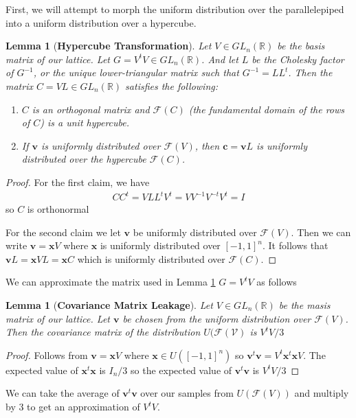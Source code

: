 \documentclass[12pt]{amsart}
\newtheorem{lemma}[theorem]{Lemma}
\theoremstyle{definition}
\theoremstyle{remark}
\newcommand{\R}{\mathbb{R}}
\begin{document}
First, we will attempt to morph the uniform distribution over the parallelepiped into a uniform distribution over a hypercube.

\begin{lemma}[\textbf{Hypercube Transformation}]\label{lem:hypercubeTransformation}
Let $V\in GL_n(\R)$ be the basis matrix of our lattice. Let $G = V^tV \in GL_n(\R)$. And let $L$ be the Cholesky factor of $G^{-1}$, or the unique lower-triangular matrix such that $G^{-1}=LL^t$. Then the matrix $C=VL\in GL_n(\R)$ satisfies the following: 
\begin{enumerate}
    \item $C$ is an orthogonal matrix and $\mathcal{F}(C)$ (the fundamental domain of the rows of $C$) is a unit hypercube.
    \item If $\bm{v}$ is uniformly distributed over $\mathcal{F}(V)$, then $\bm{c} = \bm{v}L$ is uniformly distributed over the hypercube $\mathcal{F}(C)$.
\end{enumerate}
\end{lemma}
\begin{proof}
    For the first claim, we have 
    \begin{align*}
        CC^t = VLL^tV^t=VV^{-1}V^{-t}V^t = I
    \end{align*}
    so $C$ is orthonormal
    
    For the second claim we let $\bm{v}$ be uniformly distributed over $\mathcal{F}(V)$. Then we can write $\bm{v}=\bm{x}V$ where $\bm{x}$ is uniformly distributed over $[-1,1]^n$. It follows that $\bm{v}L =\bm{x}VL=\bm{x}C$ which is uniformly distributed over $\mathcal{F}(C)$.
\end{proof}

We can approximate the matrix used in Lemma \ref{lem:hypercubeTransformation} $G = V^tV$ as follows
\begin{lemma}[\textbf{Covariance Matrix Leakage}]\label{lem:covarianceLeak}
Let $V\in GL_n(\R)$ be the masis matrix of our lattice. Let $\bm{v}$ be chosen from the uniform distribution over $\mathcal{F}(V)$. Then the covariance matrix of the distribution $U(\mathcal{F(V)}$ is $V^tV/3$
\end{lemma}
\begin{proof}
Follows from $\bm{v}=\bm{x}V$ where $\bm{x}\in U([-1,1]^n)$ so $\bm{v}^t\bm{v} = V^t\bm{x}^t\bm{x}V$. The expected value of $\bm{x}^t\bm{x}$ is $I_n/3$ so the expected value of $\bm{v}^t\bm{v}$ is $V^tV/3$
\end{proof}

We can take the average of $\bm{v}^t\bm{v}$ over our samples from $U(\mathcal{F}(V))$ and multiply by 3 to get an approximation of $V^tV$.
\end{document}
